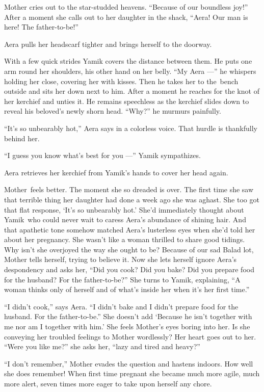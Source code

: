 \documentclass[twoside,11pt,openany]{book}
\begin{document}
Mother cries out to the star-studded heavens. ``Because of our boundless joy!'' After a
moment she calls out to her daughter in the shack, ``Aera! Our man is here! The
father-to-be!''

Aera pulls her headscarf tighter and brings herself to the doorway.

With a few quick strides Yamik covers the distance between them. He puts one arm round her shoulders, his other hand on
her belly. ``My Aera ---'' he whispers holding her close, covering her with kisses. Then he
takes her to the~bench outside and sits her down next to him. After a moment he reaches for the knot of her kerchief
and unties it. He remains speechless as the kerchief slides down to reveal his beloved's newly shorn head.
``Why?'' he murmurs painfully.

``It's so unbearably hot,'' Aera says in a colorless voice. That hurdle is thankfully behind
her.

``I guess you know what's best for you ---'' Yamik sympathizes.

Aera retrieves her kerchief from Yamik's hands to cover her head again.

Mother~feels better. The moment she so dreaded is over. The first time she saw that terrible thing her daughter had done
a week ago she was aghast. She too got that flat response, `It's so unbearably hot.' She'd immediately thought about
Yamik~who could never wait to caress Aera's abundance of shining hair. And that apathetic tone somehow matched Aera's
lusterless eyes when she'd told her about her pregnancy. She wasn't like a woman thrilled to share good tidings. Why
isn't she overjoyed the way she ought to be? Because of our sad Balad lot, Mother tells herself, trying to believe it.
 Now she lets herself ignore Aera's despondency and asks her, ``Did you cook? Did you bake? Did you
prepare food for the husband? For the father-to-be?'' She turns to Yamik, explaining, ``A
woman thinks only of herself and of what's inside her when it's her first time.''

``I didn't cook,'' says Aera. ``I didn't bake and I didn't prepare food for the
husband. For the father-to-be.'' She doesn't add `Because he isn't together with me nor am I together with
him.' She feels Mother's eyes boring into her. Is she conveying her troubled feelings to Mother wordlessly? Her
heart goes out to her. ``Were you like me?'' she asks her, ``lazy and tired and heavy?''

``I don't remember,'' Mother evades the question and hastens indoors. How well she does
remember! When first time pregnant she became much more agile, much more alert, seven times more eager to take upon
herself any chore.
\end{document}
